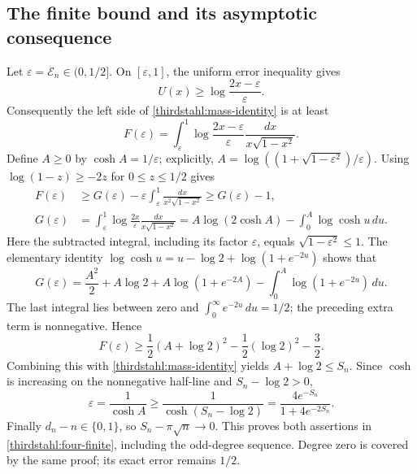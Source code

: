 \documentclass[11pt]{article}
\theoremstyle{remark}
\numberwithin{equation}{section}
\begin{document}
\subsection{The finite bound and its asymptotic consequence}
Let $\varepsilon=\mathcal E_n\in(0,1/2]$.
On $[\varepsilon,1]$, the uniform error inequality gives
\[
 U(x)\ge\log\frac{2x-\varepsilon}{\varepsilon}.
\]
Consequently the left side of \eqref{thirdstahl:mass-identity} is
at least
\[
 F(\varepsilon)=\int_\varepsilon^1
   \log\frac{2x-\varepsilon}{\varepsilon}
   \frac{dx}{x\sqrt{1-x^2}}.
\]
Define $A\ge0$ by $\cosh A=1/\varepsilon$; explicitly,
$A=\log((1+\sqrt{1-\varepsilon^2})/\varepsilon)$.
Using $\log(1-z)\ge-2z$ for $0\le z\le1/2$ gives
\begin{align*}
 F(\varepsilon)&\ge
 G(\varepsilon)-\varepsilon
       \int_\varepsilon^1\frac{dx}{x^2\sqrt{1-x^2}}
 \ge G(\varepsilon)-1,\\
 G(\varepsilon)&=
 \int_\varepsilon^1\log\frac{2x}{\varepsilon}
       \frac{dx}{x\sqrt{1-x^2}}
 =A\log(2\cosh A)-\int_0^A\log\cosh u\,du.
\end{align*}
Here the subtracted integral, including its factor $\varepsilon$,
equals $\sqrt{1-\varepsilon^2}\le1$.
The elementary identity
$\log\cosh u=u-\log2+\log(1+e^{-2u})$ shows that
\[
 G(\varepsilon)=\frac{A^2}{2}+A\log2
 +A\log(1+e^{-2A})-\int_0^A\log(1+e^{-2u})\,du.
\]
The last integral lies between zero and
$\int_0^\infty e^{-2u}\,du=1/2$; the preceding extra term is
nonnegative.  Hence
\[
 F(\varepsilon)\ge
 \frac12(A+\log2)^2-\frac12(\log2)^2-\frac32.
\]
Combining this with \eqref{thirdstahl:mass-identity} yields
$A+\log2\le S_n$.  Since $\cosh$ is increasing on the nonnegative
half-line and $S_n-\log2>0$,
\[
 \varepsilon=\frac1{\cosh A}
 \ge\frac1{\cosh(S_n-\log2)}
 =\frac{4e^{-S_n}}{1+4e^{-2S_n}}.
\]
Finally $d_n-n\in\{0,1\}$, so $S_n-\pi\sqrt n\to0$.
This proves both assertions in \eqref{thirdstahl:four-finite},
including the odd-degree sequence.  Degree zero is covered by the
same proof; its exact error remains $1/2$.
\end{document}

